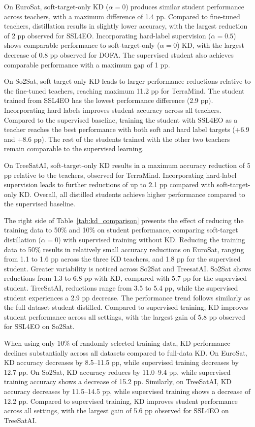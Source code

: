 \documentclass[conference]{IEEEtran}
\begin{document}
On EuroSat, soft-target-only KD ($\alpha=0$) produces similar student performance across teachers, with a maximum difference of 1.4 pp.
Compared to fine-tuned teachers, distillation results in slightly lower accuracy, with the largest reduction of 2 pp observed for SSL4EO.
Incorporating hard-label supervision ($\alpha=0.5$) shows comparable performance to soft-target-only ($\alpha=0$) KD, with the largest decrease of 0.8 pp observed for DOFA.
The supervised student also achieves comparable performance with a maximum gap of 1 pp.

On So2Sat, soft-target-only KD leads to larger performance reductions relative to the fine-tuned teachers, reaching maximum 11.2 pp for TerraMind.
The student trained from SSL4EO has the lowest performance difference (2.9 pp).
Incorporating hard labels improves student accuracy across all teachers.
Compared to the supervised baseline, training the student with SSL4EO as a teacher reaches the best performance with both soft and hard label targets (+6.9 and +8.6 pp).
The rest of the students trained with the other two teachers remain comparable to the supervised learning.

On TreeSatAI, soft-target-only KD results in a maximum accuracy reduction of 5 pp relative to the teachers, observed for TerraMind.
Incorporating hard-label supervision leads to further reductions of up to 2.1 pp compared with soft-target-only KD.
Overall, all distilled students achieve higher performance compared to the supervised baseline.

The right side of Table~\ref{tab:kd_comparison} presents the effect of reducing the training data to 50\% and 10\% on student performance, comparing soft-target distillation ($\alpha=0$) with supervised training without KD.
Reducing the training data to 50\% results in relatively small accuracy reductions on EuroSat, ranging from 1.1 to 1.6 pp across the three KD teachers, and 1.8 pp for the supervised student.
Greater variability is noticed across So2Sat and TreesatAI.
So2Sat shows reductions from 1.3 to 6.8 pp with KD, compared with 5.7 pp for the supervised student.
TreeSatAI, reductions range from 3.5 to 5.4 pp, while the supervised student experiences a 2.9 pp decrease.
The performance trend follows similarly as the full dataset student distilled.
Compared to supervised training, KD improves student performance across all settings, with the largest gain of 5.8 pp observed for SSL4EO on So2Sat.

When using only 10\% of randomly selected training data, KD performance declines substantially across all datasets compared to full-data KD.
On EuroSat, KD accuracy decreases by 8.5--11.5 pp,  while supervised training decreases by 12.7 pp.
On So2Sat, KD accuracy reduces by 11.0--9.4 pp, while supervised training accuracy shows a decrease of 15.2 pp.
Similarly, on TreeSatAI, KD accuracy decreases by 11.5--14.5 pp, while supervised training shows a decrease of 12.2 pp.
Compared to supervised training, KD improves student performance across all settings, with the largest gain of 5.6 pp observed for SSL4EO on TreeSatAI.
\end{document}
